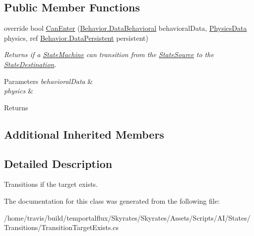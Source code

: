 \subsection*{Public Member Functions}
\begin{DoxyCompactItemize}
\item 
\hypertarget{class_skyrates_1_1_a_i_1_1_state_1_1_transition_1_1_transition_target_exists_a23dc7eee9df4de00fcfec275d7781b73}{override bool \hyperlink{class_skyrates_1_1_a_i_1_1_state_1_1_transition_1_1_transition_target_exists_a23dc7eee9df4de00fcfec275d7781b73}{Can\-Enter} (\hyperlink{class_skyrates_1_1_a_i_1_1_behavior_1_1_data_behavioral}{Behavior.\-Data\-Behavioral} behavioral\-Data, \hyperlink{class_skyrates_1_1_physics_1_1_physics_data}{Physics\-Data} physics, ref \hyperlink{class_skyrates_1_1_a_i_1_1_behavior_1_1_data_persistent}{Behavior.\-Data\-Persistent} persistent)}\label{class_skyrates_1_1_a_i_1_1_state_1_1_transition_1_1_transition_target_exists_a23dc7eee9df4de00fcfec275d7781b73}

\begin{DoxyCompactList}\small\item\em Returns if a \hyperlink{class_skyrates_1_1_a_i_1_1_state_1_1_state_machine}{State\-Machine} can transition from the \hyperlink{class_skyrates_1_1_a_i_1_1_state_1_1_state_transition_a15c97c73b5e83f2bda77c5f4fb2521c6}{State\-Source} to the \hyperlink{class_skyrates_1_1_a_i_1_1_state_1_1_state_transition_a445177b14011fbc85aec78ecd04680f8}{State\-Destination}. 


\begin{DoxyParams}{Parameters}
{\em behavioral\-Data} & \\
\hline
{\em physics} & \\
\hline
\end{DoxyParams}
\begin{DoxyReturn}{Returns}

\end{DoxyReturn}
 \end{DoxyCompactList}\end{DoxyCompactItemize}
\subsection*{Additional Inherited Members}


\subsection{Detailed Description}
Transitions if the target exists. 



The documentation for this class was generated from the following file\-:\begin{DoxyCompactItemize}
\item 
/home/travis/build/temportalflux/\-Skyrates/\-Skyrates/\-Assets/\-Scripts/\-A\-I/\-States/\-Transitions/Transition\-Target\-Exists.\-cs\end{DoxyCompactItemize}
